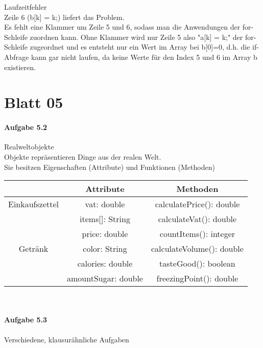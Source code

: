 \documentclass[paper=a4, fontsize=11pt]{scrartcl}
\numberwithin{equation}{section}
\numberwithin{figure}{section}
\numberwithin{table}{section}
\begin{document}
Laufzeitfehler \\
Zeile 6 (b[k] = k;) liefert das Problem.\\
Es fehlt eine Klammer um Zeile 5 und 6, sodass man die Anwendungen der for-Schleife zuordnen kann. Ohne Klammer wird nur Zeile 5 also "a[k] = k;" der for-Schleife zugeordnet und es entsteht nur ein Wert im Array bei b[0]=0, d.h. die if-Abfrage kann gar nicht laufen, da keine Werte für den Index 5 und 6 im Array b existieren. \\


\newpage

\section{Blatt 05}

\paragraph{Aufgabe 5.2} Realweltobjekte \\
Objekte repräsentieren Dinge aus der realen Welt. \\
Sie besitzen Eigenschaften (Attribute) und Funktionen (Methoden)\\

\begin{tabular}{|c|c|c|}
 \hline
 & Attribute & Methoden \\
 \hline
 Einkaufszettel & vat: double & calculatePrice(): double\\
                & items[]: String & calculateVat(): double \\
                & price: double & countItems(): integer \\
 \hline 
 Getränk & color: String & calculateVolume(): double \\
         & calories: double & tasteGood(): boolean \\
         & amountSugar: double & freezingPoint(): double \\
 \hline
\end{tabular}
\\


\paragraph{Aufgabe 5.3} Verschiedene, klausurähnliche Aufgaben \\
\end{document}
